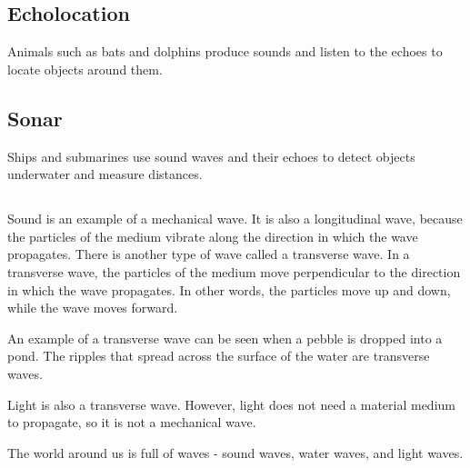 \documentclass{xtufte-handout}
\begin{document}
\subsection{Echolocation}
Animals such as bats and dolphins produce sounds and listen to the echoes to locate objects around them.
\subsection{Sonar}
Ships and submarines use sound waves and their echoes to detect objects underwater and measure distances.


\subsection{}
Sound is an example of a mechanical wave. It is also a longitudinal wave, because the particles of the medium vibrate along the direction in which the wave propagates. There is another type of wave called a transverse wave. In a transverse wave, the particles of the medium move perpendicular to the direction in which the wave propagates. In other words, the particles move up and down, while the wave moves forward.

An example of a transverse wave can be seen when a pebble is dropped into a pond. The ripples that spread across the surface of the water are transverse waves.

Light is also a transverse wave. However, light does not need a material medium to propagate, so it is not a mechanical wave.

The world around us is full of waves - sound waves, water waves, and light waves.
\end{document}
